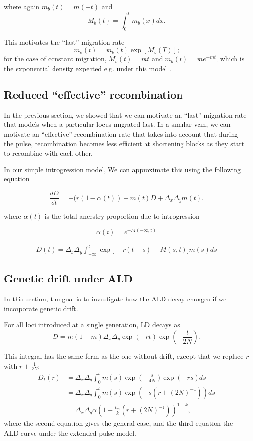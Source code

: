 \documentclass[11pt]{article}
\begin{document}
where again $m_b(t) = m(-t)$ and $$M_b(t) = \int_0^t m_b(x)dx\text{.}$$

This motivates the ``last'' migration rate $$m_e(t) = m_b(t) \exp[M_b(T)]\text{;}$$ for the 
case of constant migration, $M_b(t) = mt$ and $m_b(t)= m e^{-mt}$, which is the exponential density expected e.g. under this model \citep{pool_inference_2009}.

\subsection{Reduced ``effective'' recombination}\label{Appendix_3}

In the previous section, we showed that we can motivate an ``last'' migration rate that models when a particular locus migrated last. In a similar vein, we can motivate an ``effective'' recombination rate that takes into account that during the pulse, recombination becomes less efficient at shortening blocks as they start to recombine with each other. 

In our simple introgression model, We can approximate this using the following equation

\begin{equation}
    \frac{dD}{dt} = -(r(1-\alpha(t)) - m(t) D + \Delta_x\Delta_y m(t)\text{.}
\end{equation}

where $\alpha(t)$ is the total ancestry proportion due to introgression

\begin{equation}
    \alpha(t) = e^{-M(-\infty, t)}
\end{equation}

\begin{align}
    D(t) = \Delta_x\Delta_y\int_{-\infty}^t \exp\big[-r(t -s) - M(s,t)\big] m(s) ds
\end{align}



\subsection{Genetic drift under ALD}\label{Appendix_4}

In this section, the goal is to investigate how the ALD decay changes if we incorporate genetic drift.

For all loci introduced at a single generation, LD decays as \cite{loh_inferring_2013}
$$D = m(1-m)\Delta_x\Delta_y\exp(-rt)\exp(-\frac{t}{2N}).$$

This integral has the same form as the one without drift, except that we replace $r$ with $r + \frac{1}{2N}$:
\begin{align}
    D_t(r) &= \Delta_x\Delta_y\int_0^t m(s)\exp\left(-\frac{s}{4N}\right)\exp(-rs) ds \nonumber\\
        &= \Delta_x\Delta_y\int_0^t
        m(s)\exp\left(-s(r+(2N)^{-1})\right) ds \label{eq:ld_drift}\\
&= \Delta_x\Delta_y \alpha\left(1 + \frac{t_m}{k} (r+(2N)^{-1})\right) ^{1-k} ,
\end{align}
where the second equation gives the general case, and the third equation the ALD-curve under the extended pulse model. 

\hypertarget{refs}{}




\end{document}
